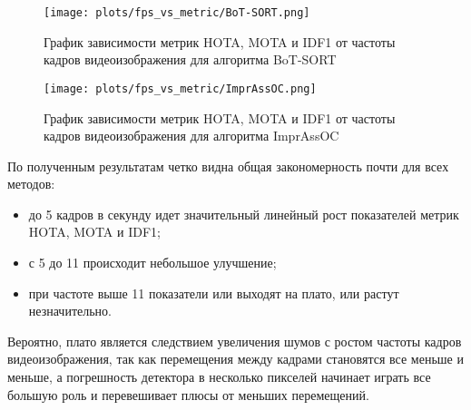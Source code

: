 \begin{figure}[ht]
    \centering
    \texttt{[image: plots/fps\_vs\_metric/BoT-SORT.png]}
    \caption{График зависимости метрик HOTA, MOTA и IDF1 от частоты кадров видеоизображения для алгоритма BoT-SORT}
    \label{fig:fps_BoT-SORT}
\end{figure}

\begin{figure}[ht]
    \centering
    \texttt{[image: plots/fps\_vs\_metric/ImprAssOC.png]}
    \caption{График зависимости метрик HOTA, MOTA и IDF1 от частоты кадров видеоизображения для алгоритма ImprAssOC}
    \label{fig:fps_ImprAssOC}
\end{figure}
\FloatBarrier

По полученным результатам четко видна общая закономерность почти для всех методов: 
\begin{itemize}
    \item до 5 кадров в секунду идет значительный линейный рост показателей метрик HOTA, MOTA и IDF1;
    \item с 5 до 11 происходит небольшое улучшение;
    \item при частоте выше 11 показатели или выходят на плато, или растут незначительно.
\end{itemize}
Вероятно, плато является следствием увеличения шумов с ростом частоты кадров видеоизображения, так как перемещения между кадрами становятся все меньше и меньше, а погрешность детектора в несколько пикселей начинает играть все большую роль и перевешивает плюсы от меньших перемещений.